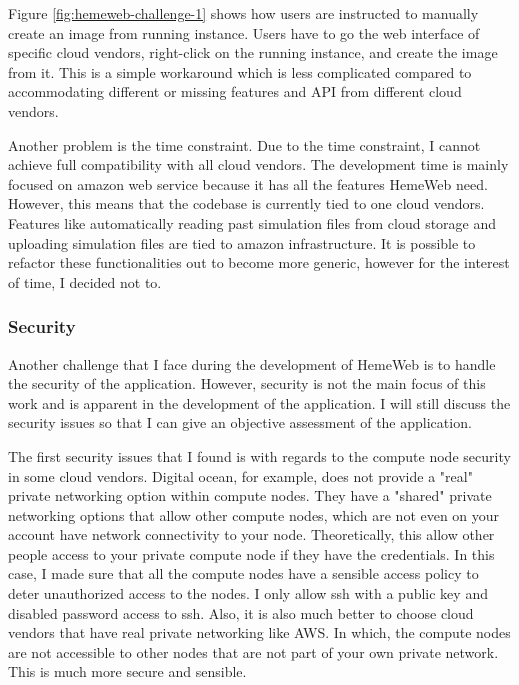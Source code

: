 \vspace{1cm}

Figure \ref{fig:hemeweb-challenge-1} shows how users are instructed to manually create an image from running instance. Users have to go the web interface of specific cloud vendors, right-click on the running instance, and create the image from it. This is a simple workaround which is less complicated compared to accommodating different or missing features and API from different cloud vendors.


Another problem is the time constraint. Due to the time constraint, I cannot achieve full compatibility with all cloud vendors. The development time is mainly focused on amazon web service because it has all the features HemeWeb need. However, this means that the codebase is currently tied to one cloud vendors. Features like automatically reading past simulation files from cloud storage and uploading simulation files are tied to amazon infrastructure. It is possible to refactor these functionalities out to become more generic, however for the interest of time, I decided not to.

\subsubsection{Security}

Another challenge that I face during the development of HemeWeb is to handle the security of the application. However, security is not the main focus of this work and is apparent in the development of the application. I will still discuss the security issues so that I can give an objective assessment of the application.

The first security issues that I found is with regards to the compute node security in some cloud vendors. Digital ocean, for example, does not provide a "real" private networking option within compute nodes. They have a "shared" private networking options that allow other compute nodes, which are not even on your account have network connectivity to your node. Theoretically, this allow other people access to your private compute node if they have the credentials. In this case, I made sure that all the compute nodes have a sensible access policy to deter unauthorized access to the nodes. I only allow ssh with a public key and disabled password access to ssh. Also, it is also much better to choose cloud vendors that have real private networking like AWS. In which, the compute nodes are not accessible to other nodes that are not part of your own private network. This is much more secure and sensible.


